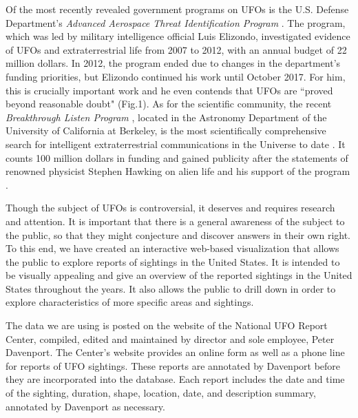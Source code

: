 \documentclass[journal]{vgtc}                %
\begin{document}
\indent Of the most recently revealed government programs on UFOs is the U.S. Defense Department's \textit{Advanced Aerospace Threat Identification Program} \cite{pentagon}. The program, which was led by military intelligence official Luis Elizondo, investigated evidence of UFOs and extraterrestrial life from 2007 to 2012, with an annual budget of 22 million dollars. In 2012, the program ended due to changes in the department's funding priorities, but Elizondo continued his work until October 2017. For him, this is crucially important work and he even contends that UFOs are ``proved beyond reasonable doubt" (Fig.1). As for the scientific community, the recent \textit{Breakthrough Listen Program} \cite{listen}, located in the Astronomy Department of the University of California at Berkeley, is the most scientifically comprehensive search for intelligent extraterrestrial communications in the Universe to date \cite{listenwiki}. It counts 100 million dollars in funding and gained publicity after the statements of renowned physicist Stephen Hawking on alien life and his support of the program \cite{hawking}.

Though the subject of UFOs is controversial, it deserves and requires research and attention. It is important that there is a general awareness of the subject to the public, so that they might conjecture and discover answers in their own right. To this end, we have created an interactive web-based visualization that allows the public to explore reports of sightings in the United States. It is intended to be visually appealing and give an overview of the reported sightings in the United States throughout the years. It also allows the public to drill down in order to explore characteristics of more specific areas and sightings.

The data we are using is posted on the website of the National UFO Report Center, compiled, edited and maintained by director and sole employee, Peter Davenport. The Center's website provides an online form as well as a phone line for reports of UFO sightings. These reports are annotated by Davenport before they are incorporated into the database. Each report includes the date and time of the sighting, duration, shape, location, date, and description summary, annotated by Davenport as necessary. 
\end{document}
